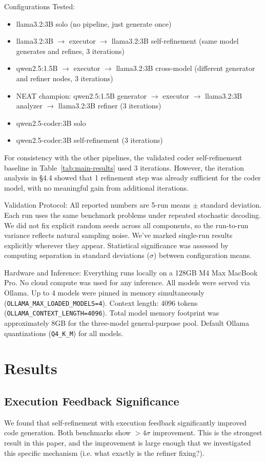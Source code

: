 \documentclass{article}
\begin{document}
Configurations Tested:
\begin{itemize}
    \item llama3.2:3B solo (no pipeline, just generate once)
    \item llama3.2:3B $\rightarrow$ executor $\rightarrow$ llama3.2:3B self-refinement (same model generates and refines, 3 iterations)
    \item qwen2.5:1.5B $\rightarrow$ executor $\rightarrow$ llama3.2:3B cross-model (different generator and refiner nodes, 3 iterations)
    \item NEAT champion: qwen2.5:1.5B generator $\rightarrow$ executor $\rightarrow$ llama3.2:3B analyzer $\rightarrow$ llama3.2:3B refiner (3 iterations)
    \item qwen2.5-coder:3B solo
    \item qwen2.5-coder:3B self-refinement (3 iterations)
\end{itemize}

For consistency with the other pipelines, the validated coder self-refinement baseline in Table~\ref{tab:main-results} used 3 iterations. However, the iteration analysis in \S4.4 showed that 1 refinement step was already sufficient for the coder model, with no meaningful gain from additional iterations.

Validation Protocol:
All reported numbers are 5-run means $\pm$ standard deviation. Each run uses the same benchmark problems under repeated stochastic decoding. We did not fix explicit random seeds across all components, so the run-to-run variance reflects natural sampling noise. We've marked single-run results explicitly wherever they appear. Statistical significance was assessed by computing separation in standard deviations ($\sigma$) between configuration means.

Hardware and Inference:
Everything runs locally on a 128GB M4 Max MacBook Pro. No cloud compute was used for any inference. All models were served via Ollama. Up to 4 models were pinned in memory simultaneously (\texttt{OLLAMA\_MAX\_LOADED\_MODELS=4}). Context length: 4096 tokens (\texttt{OLLAMA\_CONTEXT\_LENGTH=4096}). Total model memory footprint was approximately 8GB for the three-model general-purpose pool. Default Ollama quantizations (\texttt{Q4\_K\_M}) for all models.

\section{Results}
\subsection{Execution Feedback Significance}
We found that self-refinement with execution feedback significantly improved code generation. Both benchmarks show $>4\sigma$ improvement. This is the strongest result in this paper, and the improvement is large enough that we investigated this specific mechanism (i.e. what exactly is the refiner fixing?).
\end{document}
